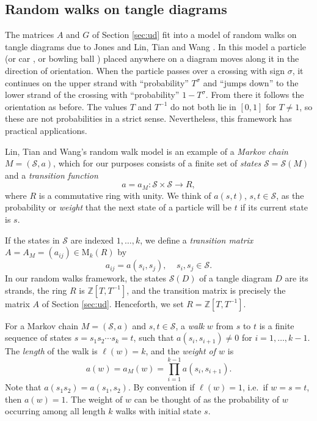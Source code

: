 \documentclass[11pt,hyp,]{nyjm}
\newcommand{\Z}{\mathbb{Z}}
\numberwithin{thm}{section}
\theoremstyle{definition}
\theoremstyle{remark}
\begin{document}
	\subsection{Random walks on tangle diagrams}
	
	The matrices $A$ and $G$ of Section \ref{sec:ud} fit into a model of random walks on tangle diagrams due to Jones \cite{jon87} and Lin, Tian and Wang \cite{ltw98}. In this model a particle (or car \cite{bnvdv22}, or bowling ball \cite{jon87}) placed anywhere on a diagram moves along it in the direction of orientation. When the particle passes over a crossing with sign $\sigma$, it continues on the upper strand with ``probability'' $T^\sigma$ and ``jumps down'' to the lower strand of the crossing with ``probability'' $1 - T^\sigma$. From there it follows the orientation as before. The values $T$ and $T^{-1}$ do not both lie in $[0,1]$ for $T \neq 1$, so these are not probabilities in a strict sense. Nevertheless, this framework has practical applications.
	
	Lin, Tian and Wang's random walk model is an example of a {\em Markov chain} $M = (\mathcal{S}, a)$, which for our purposes consists of a finite set of {\em states} $\mathcal{S} = \mathcal{S}(M)$ and a {\em transition function}
	$$
	a = a_M : \mathcal{S} \times \mathcal{S} \to R,
	$$
	where $R$ is a commutative ring with unity. We think of $a(s,t)$, $s,t \in \mathcal{S}$, as the probability or {\em weight} that the next state of a particle will be $t$ if its current state is $s$.
	
	If the states in $\mathcal{S}$ are indexed $1, \dots, k$, we define a {\em transition matrix} $A = A_M = (a_{ij}) \in \text{M}_k(R)$ by
	$$
	a_{ij} = a(s_i, s_j), \ \ \ \ \ s_i, s_j \in \mathcal{S}.
	$$
	In our random walks framework, the states $\mathcal{S}(D)$ of a tangle diagram $D$ are its strands, the ring $R$ is $\Z[T,T^{-1}]$, and the transition matrix is precisely the matrix $A$ of Section \ref{sec:ud}. Henceforth, we set $R = \Z[T,T^{-1}]$.
	
	For a Markov chain $M = (\mathcal{S}, a)$ and $s,t \in \mathcal{S}$, a {\em walk} $w$ from $s$ to $t$ is a finite sequence of states $s = s_1s_2 \cdots s_k = t$, such that $a(s_i, s_{i + 1}) \neq 0$ for $i = 1, \dots, k - 1$. The {\em length} of the walk is $\ell(w) = k$, and the {\em weight of $w$} is
	$$
	a(w) = a_M(w) = \prod_{i = 1}^{k - 1} a(s_i,s_{i+1}).
	$$
	Note that $a(s_1s_2) = a(s_1,s_2)$. By convention if $\ell(w) = 1$, i.e.~if $w = s = t$, then $a(w) = 1$. The weight of $w$ can be thought of as the probability of $w$ occurring among all length $k$ walks with initial state $s$.
	
\end{document}
